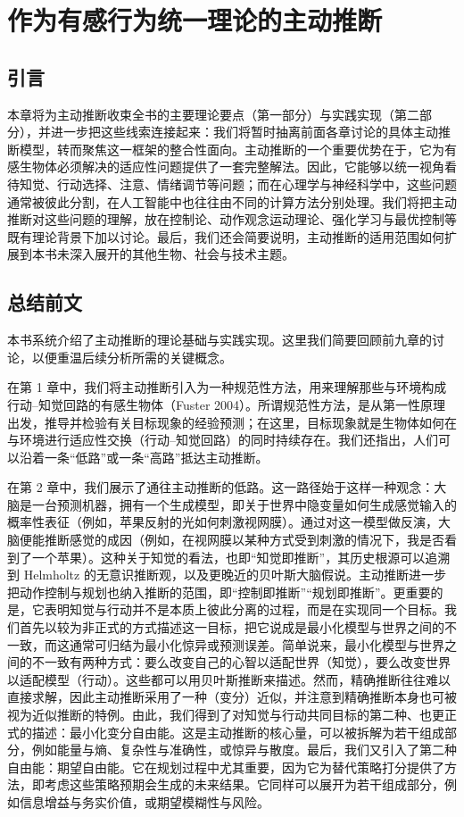 \chapter{作为有感行为统一理论的主动推断}
\section{引言}

本章将为主动推断收束全书的主要理论要点（第一部分）与实践实现（第二部分），并进一步把这些线索连接起来：我们将暂时抽离前面各章讨论的具体主动推断模型，转而聚焦这一框架的整合性面向。主动推断的一个重要优势在于，它为有感生物体必须解决的适应性问题提供了一套完整解法。因此，它能够以统一视角看待知觉、行动选择、注意、情绪调节等问题；而在心理学与神经科学中，这些问题通常被彼此分割，在人工智能中也往往由不同的计算方法分别处理。我们将把主动推断对这些问题的理解，放在控制论、动作观念运动理论、强化学习与最优控制等既有理论背景下加以讨论。最后，我们还会简要说明，主动推断的适用范围如何扩展到本书未深入展开的其他生物、社会与技术主题。

\section{总结前文}

本书系统介绍了主动推断的理论基础与实践实现。这里我们简要回顾前九章的讨论，以便重温后续分析所需的关键概念。

在第 1 章中，我们将主动推断引入为一种规范性方法，用来理解那些与环境构成行动--知觉回路的有感生物体（Fuster 2004）。所谓规范性方法，是从第一性原理出发，推导并检验有关目标现象的经验预测；在这里，目标现象就是生物体如何在与环境进行适应性交换（行动--知觉回路）的同时持续存在。我们还指出，人们可以沿着一条“低路”或一条“高路”抵达主动推断。

在第 2 章中，我们展示了通往主动推断的低路。这一路径始于这样一种观念：大脑是一台预测机器，拥有一个生成模型，即关于世界中隐变量如何生成感觉输入的概率性表征（例如，苹果反射的光如何刺激视网膜）。通过对这一模型做反演，大脑便能推断感觉的成因（例如，在视网膜以某种方式受到刺激的情况下，我是否看到了一个苹果）。这种关于知觉的看法，也即“知觉即推断”，其历史根源可以追溯到 Helmholtz 的无意识推断观，以及更晚近的贝叶斯大脑假说。主动推断进一步把动作控制与规划也纳入推断的范围，即“控制即推断”“规划即推断”。更重要的是，它表明知觉与行动并不是本质上彼此分离的过程，而是在实现同一个目标。我们首先以较为非正式的方式描述这一目标，把它说成是最小化模型与世界之间的不一致，而这通常可归结为最小化惊异或预测误差。简单说来，最小化模型与世界之间的不一致有两种方式：要么改变自己的心智以适配世界（知觉），要么改变世界以适配模型（行动）。这些都可以用贝叶斯推断来描述。然而，精确推断往往难以直接求解，因此主动推断采用了一种（变分）近似，并注意到精确推断本身也可被视为近似推断的特例。由此，我们得到了对知觉与行动共同目标的第二种、也更正式的描述：最小化变分自由能。这是主动推断的核心量，可以被拆解为若干组成部分，例如能量与熵、复杂性与准确性，或惊异与散度。最后，我们又引入了第二种自由能：期望自由能。它在规划过程中尤其重要，因为它为替代策略打分提供了方法，即考虑这些策略预期会生成的未来结果。它同样可以展开为若干组成部分，例如信息增益与务实价值，或期望模糊性与风险。

